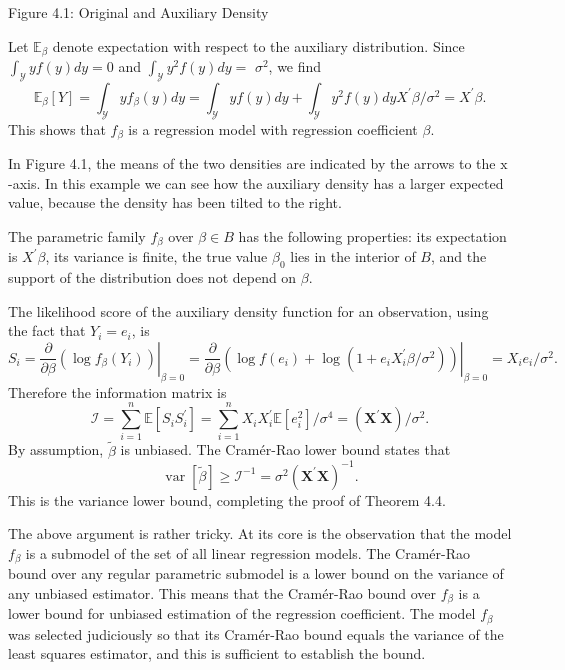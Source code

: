\documentclass[10pt]{article}
\begin{document}
Figure 4.1: Original and Auxiliary Density

Let $\mathbb{E}_{\beta}$ denote expectation with respect to the auxiliary distribution. Since $\int_{\mathscr{Y}} y f(y) d y=0$ and $\int_{\mathscr{Y}} y^{2} f(y) d y=$ $\sigma^{2}$, we find
$$
\mathbb{E}_{\beta}[Y]=\int_{\mathscr{Y}} y f_{\beta}(y) d y=\int_{\mathscr{Y}} y f(y) d y+\int_{\mathscr{Y}} y^{2} f(y) d y X^{\prime} \beta / \sigma^{2}=X^{\prime} \beta .
$$
This shows that $f_{\beta}$ is a regression model with regression coefficient $\beta$.

In Figure 4.1, the means of the two densities are indicated by the arrows to the $\mathrm{x}$-axis. In this example we can see how the auxiliary density has a larger expected value, because the density has been tilted to the right.

The parametric family $f_{\beta}$ over $\beta \in B$ has the following properties: its expectation is $X^{\prime} \beta$, its variance is finite, the true value $\beta_{0}$ lies in the interior of $B$, and the support of the distribution does not depend on $\beta$.

The likelihood score of the auxiliary density function for an observation, using the fact that $Y_{i}=e_{i}$, is
$$
S_{i}=\left.\frac{\partial}{\partial \beta}\left(\log f_{\beta}\left(Y_{i}\right)\right)\right|_{\beta=0}=\left.\frac{\partial}{\partial \beta}\left(\log f\left(e_{i}\right)+\log \left(1+e_{i} X_{i}^{\prime} \beta / \sigma^{2}\right)\right)\right|_{\beta=0}=X_{i} e_{i} / \sigma^{2} .
$$
Therefore the information matrix is
$$
\mathscr{I}=\sum_{i=1}^{n} \mathbb{E}\left[S_{i} S_{i}^{\prime}\right]=\sum_{i=1}^{n} X_{i} X_{i}^{\prime} \mathbb{E}\left[e_{i}^{2}\right] / \sigma^{4}=\left(\boldsymbol{X}^{\prime} \boldsymbol{X}\right) / \sigma^{2} .
$$
By assumption, $\widetilde{\beta}$ is unbiased. The Cramér-Rao lower bound states that
$$
\operatorname{var}[\widetilde{\beta}] \geq \mathscr{I}^{-1}=\sigma^{2}\left(\boldsymbol{X}^{\prime} \boldsymbol{X}\right)^{-1} .
$$
This is the variance lower bound, completing the proof of Theorem 4.4.

The above argument is rather tricky. At its core is the observation that the model $f_{\beta}$ is a submodel of the set of all linear regression models. The Cramér-Rao bound over any regular parametric submodel is a lower bound on the variance of any unbiased estimator. This means that the Cramér-Rao bound over $f_{\beta}$ is a lower bound for unbiased estimation of the regression coefficient. The model $f_{\beta}$ was selected judiciously so that its Cramér-Rao bound equals the variance of the least squares estimator, and this is sufficient to establish the bound.
\end{document}
